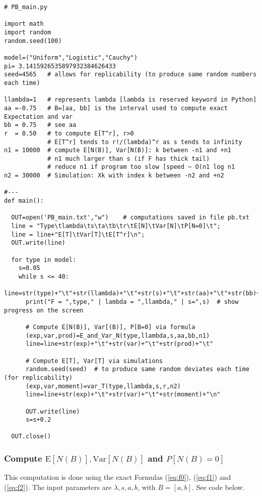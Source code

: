 \documentclass[10pt]{article}
\begin{document}
\begin{lstlisting}
# PB_main.py

import math
import random
random.seed(100)

model=("Uniform","Logistic","Cauchy")
pi= 3.1415926535897932384626433
seed=4565   # allows for replicability (to produce same random numbers each time)

llambda=1   # represents lambda [lambda is reserved keyword in Python]
aa =-0.75   # B=[aa, bb] is the interval used to compute exact Expectation and var
bb = 0.75   # see aa
r  = 0.50   # to compute E[T^r], r>0
            # E[T^r] tends to r!/(lambda)^r as s tends to infinity
n1 = 10000  # compute E[N(B)], Var[N(B)]: k between -n1 and +n1
            # n1 much larger than s (if F has thick tail)
            # reduce n1 if program too slow [speed ~ O(n1 log n1
n2 = 30000  # Simulation: Xk with index k between -n2 and +n2

#---
def main():

  OUT=open('PB_main.txt',"w")    # computations saved in file pb.txt
  line = "Type\tlambda\ts\ta\tb\tr\tE[N]\tVar[N]\tP[N=0]\t";
  line = line+"E[T]\tVar[T]\tE[T^r]\n";
  OUT.write(line)

  for type in model:
    s=0.05
    while s <= 40:
      line=str(type)+"\t"+str(llambda)+"\t"+str(s)+"\t"+str(aa)+"\t"+str(bb)+"\t"+str(r)+"\t"
      print("F = ",type," | lambda = ",llambda," | s=",s)  # show progress on the screen

      # Compute E[N(B)], Var[(B)], P[B=0] via formula
      (exp,var,prod)=E_and_Var_N(type,llambda,s,aa,bb,n1)
      line=line+str(exp)+"\t"+str(var)+"\t"+str(prod)+"\t"

      # Compute E[T], Var[T] via simulations
      random.seed(seed)  # to produce same random deviates each time (for replicability)
      (exp,var,moment)=var_T(type,llambda,s,r,n2)
      line=line+str(exp)+"\t"+str(var)+"\t"+str(moment)+"\n"

      OUT.write(line)
      s=s+0.2

  OUT.close()

\end{lstlisting}
\subsubsection{Compute $\mbox{E}[N(B)], \mbox{Var}[N(B)]$ and $P[N(B)=0]$}\label{enpi}
This computation is done using the exact Formulas (\ref{eq:f0}),  (\ref{eq:f1}) and (\ref{eq:f2}). The input parameters are $\lambda,s, a, b$, with $B=[a,b]$. See code below.
\end{document}
